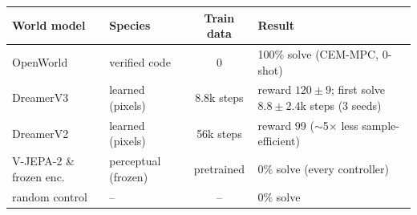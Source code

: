 \begin{tabular}{llcl}
\toprule
World model & Species & Train data & Result \\
\midrule
OpenWorld & verified code & 0 & 100\% solve (CEM-MPC, 0-shot) \\
DreamerV3 & learned (pixels) & $8.8$k steps & reward $120{\pm}9$; first solve $8.8{\pm}2.4$k steps (3 seeds) \\
DreamerV2 & learned (pixels) & 56k steps & reward 99 ($\sim$5$\times$ less sample-efficient) \\
V-JEPA-2 \& frozen enc. & perceptual (frozen) & pretrained & 0\% solve (every controller) \\
random control & -- & -- & 0\% solve \\
\bottomrule
\end{tabular}
